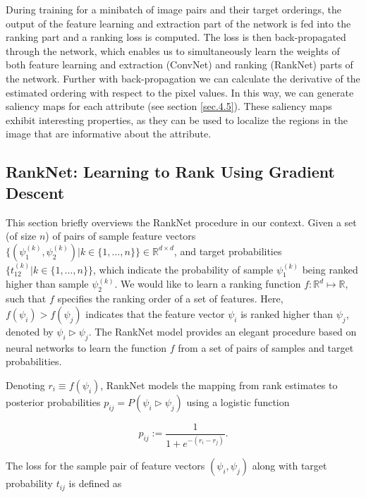 \documentclass[runningheads]{llncs}
\begin{document}
During training for a minibatch of image pairs and their target orderings, the output of the feature learning and extraction part of the network is fed into the ranking part and a ranking loss is computed. The loss is then back-propagated through the network, which enables us to simultaneously learn the weights of both feature learning and extraction (ConvNet) and ranking (RankNet) parts of the network.  
Further with back-propagation we can calculate the derivative of the estimated ordering with respect to the pixel values.
In this way, we can generate saliency maps for each attribute (see section \ref{sec.4.5}). These saliency maps exhibit interesting properties, as they can be used to localize the regions in the image that are informative about the attribute.

\subsection{RankNet: Learning to Rank Using Gradient Descent}\label{sec3.1}

This section briefly overviews the RankNet %
procedure in our context.
Given a set (of size $n$) of pairs of sample feature vectors $\big\{( \psi_{1}^{(k)}, \psi_{2}^{(k)} ) | k \in \{1, \dots, n\} \big\} \in \mathbb{R}^{d \times d}$, and target probabilities $\big\{ t_{12}^{(k)} | k \in \{1, \dots, n\} \big\}$, which indicate the probability of  
sample $\psi_{1}^{(k)}$ being ranked higher than sample $\psi_{2}^{(k)}$. 
We would like to learn a ranking function $f : \mathbb{R}^d \mapsto \mathbb{R}$, such that $f$ specifies the ranking order of a set of features. Here, $f(\psi_i) > f(\psi_j)$ indicates that the %
feature vector $\psi_i$ is ranked higher than $\psi_j$, denoted by $\psi_i \triangleright \psi_j$. The RankNet model \cite{Burges2005} provides an elegant procedure based on neural networks 
to learn the function $f$ from a set of pairs of samples and target probabilities.

Denoting $r_i \equiv f(\psi_i)$, RankNet models the mapping from rank estimates to posterior probabilities $p_{ij} = P(\psi_i \triangleright \psi_j)$ using a logistic function 

\begin{equation}
p_{ij} := \frac{1}{1 + e^{-(r_i - r_j)}}.
\label{eq1}
\end{equation}

The loss for the sample pair of feature vectors $(\psi_i, \psi_j)$ along with target probability $t_{ij}$ is defined as
\end{document}
